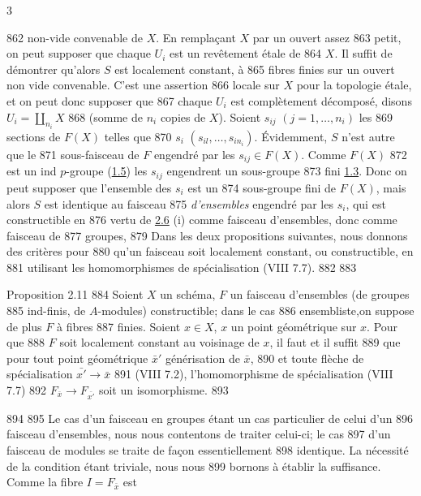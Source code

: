 3	\documentclass[10pt]{../fichiers-configuration-latex/smfart}
\begin{document}
   862	non-vide convenable de $X$. En remplaçant $X$ par un ouvert assez
   863	petit, on peut supposer que chaque $U_i$ est un revêtement étale de
   864	$X$. Il suffit de démontrer qu'alors $S$ est localement constant, à
   865	fibres finies sur un ouvert non vide convenable. C'est une assertion
   866	locale sur $X$ pour la topologie étale, et on peut donc supposer que
   867	chaque $U_i$ est complètement décomposé, disons $U_i=\amalg_{n_i}X$
   868	(somme de $n_i$ copies de $X$). Soient $s_{ij}$ $(j=1,\ldots,n_i)$ les
   869	sections de $F(X)$ telles que
   870	$s_i$ $(s_{il},\ldots,s_{in_i})$. Évidemment, $S$ n'est autre que le
   871	sous-faisceau de $F$ engendré par les $s_{ij}\in F(X)$. Comme $F(X)$
   872	est un ind $p$-groupe (\hyperref[IX.def1.5]{1.5}) les $s_{ij}$ engendrent un sous-groupe
   873	fini \hyperref[IX.def1.3]{1.3}. Donc on peut supposer que l'ensemble des $s_i$ est un
   874	sous-groupe fini de $F(X)$, mais alors $S$ est identique au faisceau
   875	\emph{d'ensembles} engendré par les $s_i$, qui est constructible en
   876	vertu de \hyperref[IX.prop2.6]{2.6} (i) comme faisceau d'ensembles, donc comme faisceau de
   877	groupes, 	
   879	Dans les deux propositions suivantes, nous donnons des critères pour
   880	qu'un faisceau soit localement constant, ou constructible, en
   881	utilisant les homomorphismes de spécialisation (VIII 7.7).
   882	
   883	\begin{enonce*}{Proposition 2.11}
   884	Soient $X$ un schéma, $F$ un faisceau d'ensembles (\resp de groupes
   885	ind-finis, \resp de $A$-modules) constructible; dans le cas
   886	ensembliste,\pageoriginale on suppose de plus $F$ à fibres
   887	finies. Soient $x\in X$, $x$ un point géométrique sur $x$. Pour que
   888	$F$ soit localement constant au voisinage de $x$, il faut et il suffit
   889	que pour tout point géométrique $\bar{x}'$ générisation de $\bar{x}$,
   890	et toute flèche de spécialisation $\bar{x'}\rightarrow \bar{x}$ {\rm
   891	(VIII 7.2)}, l'homomorphisme de spécialisation {\rm (VIII 7.7)}
   892	$F_{\bar{x}}\rightarrow F_{\bar{x'}}$ soit un isomorphisme.
   893	\end{enonce*}
   894	
   895	Le cas d'un faisceau en groupes étant un cas particulier de celui d'un
   896	faisceau d'ensembles, nous nous contentons de traiter celui-ci; le cas
   897	d'un faisceau de modules se traite de façon essentiellement
   898	identique. La nécessité de la condition étant triviale, nous nous
   899	bornons à établir la suffisance. Comme la fibre $I=F_{\bar{x}}$ est
\end{document}
